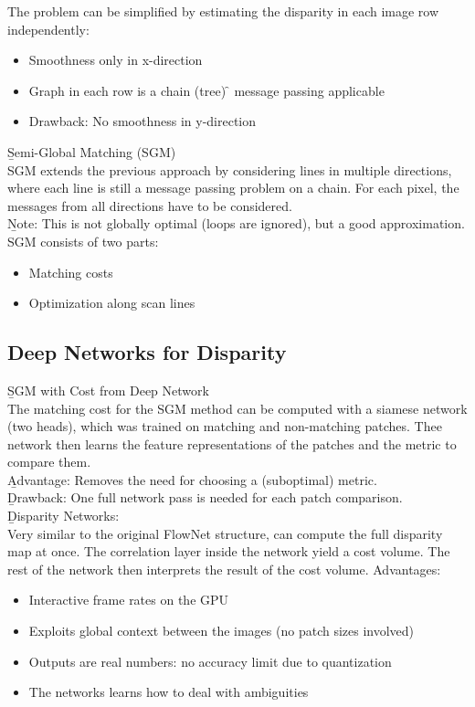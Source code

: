 The problem can be simplified by estimating the disparity in each image row independently:
\begin{itemize}
    \item Smoothness only in x-direction
    \item Graph in each row is a chain (tree) \f{\to} message passing applicable
    \item Drawback: No smoothness in y-direction
\end{itemize}
\vspace{0.5em}
\b{Semi-Global Matching (SGM)\\[.5em]}
SGM extends the previous approach by considering lines in multiple directions, where each line is still a message passing problem on a chain. For each pixel, the messages from all directions have to be considered.\\

\b{Note:} This is not globally optimal (loops are ignored), but a good approximation.\\

SGM consists of two parts:
\begin{itemize}
    \item Matching costs
    \item Optimization along scan lines
\end{itemize}

\subsection{Deep Networks for Disparity}
\b{SGM with Cost from Deep Network\\[.5em]}
The matching cost for the SGM method can be computed with a siamese network (two heads), which was trained on matching and non-matching patches. Thee network then learns the feature representations of the patches and the metric to compare them.\\

\b{Advantage:} Removes the need for choosing a (suboptimal) metric.\\
\b{Drawback:} One full network pass is needed for each patch comparison.\\

\b{Disparity Networks:\\[.5em]}
Very similar to the original FlowNet structure, can compute the full disparity map at once. The correlation layer inside the network yield a cost volume. The rest of the network then interprets the result of the cost volume.
\newpage
Advantages:
\begin{itemize}
    \item Interactive frame rates on the GPU
    \item Exploits global context between the images (no patch sizes involved)
    \item Outputs are real numbers: no accuracy limit due to quantization
    \item The networks learns how to deal with ambiguities
\end{itemize}

